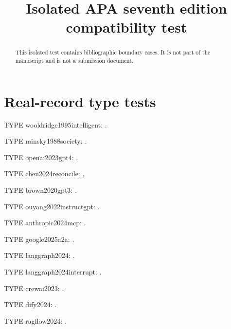 \documentclass[a4paper,fleqn]{cas-dc}
\newcommand{\restoretestcolumns}{%
  \normalfont\setlength{\columnsep}{18pt}%
  \setlength{\columnwidth}{\dimexpr(\textwidth-\columnsep)/2\relax}%
  \setlength{\hsize}{\columnwidth}\setlength{\linewidth}{\columnwidth}}
\begin{document}
\let\WriteBookmarks\relax
\renewcommand{\printorcid}{}
\title{Isolated APA seventh edition compatibility test}
\begin{abstract}This isolated test contains bibliographic boundary cases.
It is not part of the manuscript and is not a submission document.\end{abstract}
\maketitle\restoretestcolumns
\setlength{\emergencystretch}{1em}
\section{Real-record type tests}
\noindent TYPE wooldridge1995intelligent: \citep{wooldridge1995intelligent}.\par
\noindent TYPE minsky1988society: \citep{minsky1988society}.\par
\noindent TYPE openai2023gpt4: \citep{openai2023gpt4}.\par
\noindent TYPE chen2024reconcile: \citep{chen2024reconcile}.\par
\noindent TYPE brown2020gpt3: \citep{brown2020gpt3}.\par
\noindent TYPE ouyang2022instructgpt: \citep{ouyang2022instructgpt}.\par
\noindent TYPE anthropic2024mcp: \citep{anthropic2024mcp}.\par
\noindent TYPE google2025a2a: \citep{google2025a2a}.\par
\noindent TYPE langgraph2024: \citep{langgraph2024}.\par
\noindent TYPE langgraph2024interrupt: \citep{langgraph2024interrupt}.\par
\noindent TYPE crewai2023: \citep{crewai2023}.\par
\noindent TYPE dify2024: \citep{dify2024}.\par
\noindent TYPE ragflow2024: \citep{ragflow2024}.\par
\nocite{*}

\printbibliography
\end{document}
